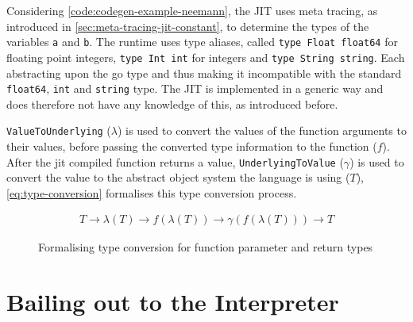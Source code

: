 Considering \autoref{code:codegen-example-neemann}, the JIT uses meta tracing,
as introduced in \autoref{sec:meta-tracing-jit-constant}, to determine the
types of the variables \texttt{a} and \texttt{b}. The runtime uses type
aliases, called \texttt{type Float float64} for floating point
integers, \texttt{type Int int} for integers and 
\texttt{type String string}. Each abstracting upon the go type and thus making it
incompatible with the standard \texttt{float64}, \texttt{int}
and \texttt{string} type. The JIT is implemented in a generic way and
does therefore not have any knowledge of this, as introduced before.

\texttt{ValueToUnderlying} ($\lambda$) is used to convert the values of the
function arguments to their values, before passing the converted type
information to the function ($f$). After the jit compiled function returns a
value, \texttt{UnderlyingToValue} ($\gamma$) is used to convert the value to
the abstract object system the language is using ($T$),
\autoref{eq:type-conversion} formalises this type conversion process.

\begin{figure}[H]
    \begin{eqnarray}
T \rightarrow \lambda(T) \rightarrow f(\lambda(T)) \rightarrow \gamma(f(\lambda(T))) \rightarrow T
    \end{eqnarray}
    \caption{Formalising type conversion for function parameter and return types}
    \label{eq:type-conversion}
\end{figure}

\section{Bailing out to the Interpreter}


